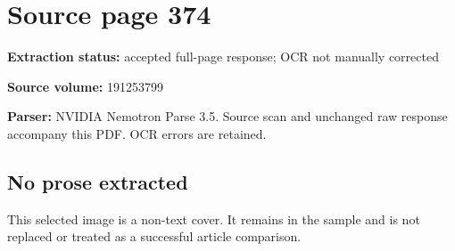 \clearpage
\section{Source page 374}
\textbf{Extraction status:} accepted full-page response; OCR not manually corrected\par
\textbf{Source volume:} 191253799\par
\textbf{Parser:} NVIDIA Nemotron Parse 3.5. Source scan and unchanged raw response accompany this PDF. OCR errors are retained.\par\medskip
\subsection*{No prose extracted}
This selected image is a non-text cover. It remains in the sample and is not replaced or treated as a successful article comparison.

